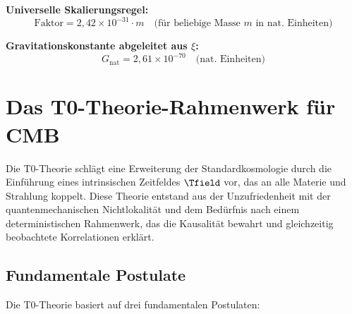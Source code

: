	\textbf{Universelle Skalierungsregel:}
	\begin{equation}
		\text{Faktor} = 2,42 \times 10^{-31} \cdot m \quad \text{(für beliebige Masse } m \text{ in nat. Einheiten)}
	\end{equation}
	
	\textbf{Gravitationskonstante abgeleitet aus $\xi$:}
	\begin{equation}
		G_{\text{nat}} = 2,61 \times 10^{-70} \quad \text{(nat. Einheiten)}
	\end{equation}
	
	
	\section{Das T0-Theorie-Rahmenwerk für CMB}
	\label{sec:t0_framework}
	
	Die T0-Theorie schlägt eine Erweiterung der Standardkosmologie durch die Einführung eines intrinsischen Zeitfeldes $\Tfield$ vor, das an alle Materie und Strahlung koppelt. Diese Theorie entstand aus der Unzufriedenheit mit der quantenmechanischen Nichtlokalität und dem Bedürfnis nach einem deterministischen Rahmenwerk, das die Kausalität bewahrt und gleichzeitig beobachtete Korrelationen erklärt.
	
	\subsection{Fundamentale Postulate}
	
	Die T0-Theorie basiert auf drei fundamentalen Postulaten:
	

